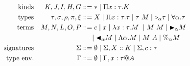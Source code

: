 {%
\begin{align*}
    \textrm{kinds}             &  & K,J,I,H,G                & ::= * \mid \Pi x:\tau.K                                                           \\
    \textrm{types}             &  & \tau,\sigma,\rho,\pi,\xi & ::= X \mid \Pi x:\tau.\tau \mid \tau\ M \mid {\mathop{\triangleright}}_{\alpha} \tau \mid \forall\alpha.\tau \\
    \textrm{terms}             &  & M,N,L,O,P                & ::= c \mid x \mid \lambda x:\tau.M\ \mid M\ M \mid {\mathop{\blacktriangleright}}_\alpha M                   \\
                               &  &                          & \ \ \ \ \mid {\mathop{\blacktriangleleft}}_\alpha M \mid \Lambda\alpha.M \mid M\ A \mid \%_\alpha M        \\
    \textrm{signatures}         &  & \Sigma                   & ::= \emptyset \mid \Sigma, X::K \mid \Sigma, c:\tau                               \\
    \textrm{type env.} &  & \Gamma                   & ::= \emptyset \mid  \Gamma,x:\tau @A                                              \\
\end{align*}
}


